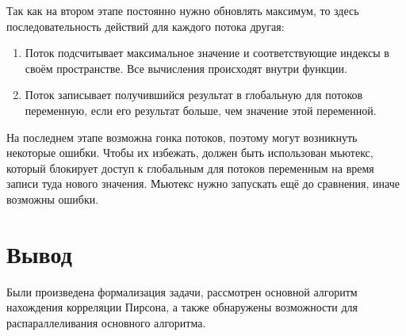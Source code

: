 Так как на втором этапе постоянно нужно обновлять максимум, то здесь последовательность действий для каждого потока другая:
\begin{enumerate}
	\item Поток подсчитывает максимальное значение и соответствующие индексы в своём пространстве. Все вычисления происходят внутри функции.
	\item Поток записывает получившийся результат в глобальную для потоков переменную, если его результат больше, чем значение этой переменной.
\end{enumerate}

На последнем этапе возможна гонка потоков, поэтому могут возникнуть некоторые ошибки. Чтобы их избежать, должен быть использован мьютекс,
который блокирует доступ к глобальным для потоков переменным на время записи туда нового значения. Мьютекс нужно запускать ещё до сравнения,
иначе возможны ошибки. 

\section{Вывод}
Были произведена формализация задачи, рассмотрен основной алгоритм нахождения корреляции Пирсона, а также обнаружены возможности
для распараллеливания основного алгоритма.